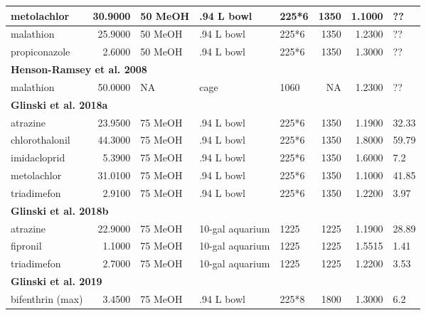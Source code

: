 \documentclass[
]{article}
\begin{document}
\begin{table}
\begin{tabular}{l|r|l|l|l|r|r|l}
\hline
\hspace{1em}metolachlor & 30.9000 & 50 MeOH & .94 L bowl & 225*6 & 1350 & 1.1000 & ??\\
\hline
\hspace{1em}malathion & 25.9000 & 50 MeOH & .94 L bowl & 225*6 & 1350 & 1.2300 & ??\\
\hline
\hspace{1em}propiconazole & 2.6000 & 50 MeOH & .94 L bowl & 225*6 & 1350 & 1.3000 & ??\\
\hline
\multicolumn{8}{l}{\textbf{Henson-Ramsey et al. 2008}}\\
\hline
\hspace{1em}malathion & 50.0000 & NA & cage & 1060 & NA & 1.2300 & ??\\
\hline
\multicolumn{8}{l}{\textbf{Glinski et al. 2018a}}\\
\hline
\hspace{1em}atrazine & 23.9500 & 75 MeOH & .94 L bowl & 225*6 & 1350 & 1.1900 & 32.33\\
\hline
\hspace{1em}chlorothalonil & 44.3000 & 75 MeOH & .94 L bowl & 225*6 & 1350 & 1.8000 & 59.79\\
\hline
\hspace{1em}imidacloprid & 5.3900 & 75 MeOH & .94 L bowl & 225*6 & 1350 & 1.6000 & 7.2\\
\hline
\hspace{1em}metolachlor & 31.0100 & 75 MeOH & .94 L bowl & 225*6 & 1350 & 1.1000 & 41.85\\
\hline
\hspace{1em}triadimefon & 2.9100 & 75 MeOH & .94 L bowl & 225*6 & 1350 & 1.2200 & 3.97\\
\hline
\multicolumn{8}{l}{\textbf{Glinski et al. 2018b}}\\
\hline
\hspace{1em}atrazine & 22.9000 & 75 MeOH & 10-gal aquarium & 1225 & 1225 & 1.1900 & 28.89\\
\hline
\hspace{1em}fipronil & 1.1000 & 75 MeOH & 10-gal aquarium & 1225 & 1225 & 1.5515 & 1.41\\
\hline
\hspace{1em}triadimefon & 2.7000 & 75 MeOH & 10-gal aquarium & 1225 & 1225 & 1.2200 & 3.53\\
\hline
\multicolumn{8}{l}{\textbf{Glinski et al. 2019}}\\
\hline
\hspace{1em}bifenthrin (max) & 3.4500 & 75 MeOH & .94 L bowl & 225*8 & 1800 & 1.3000 & 6.2\\

\end{tabular}
\end{table}
\end{document}
